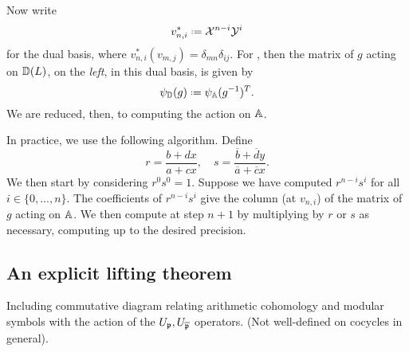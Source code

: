 \documentclass[a4paper,10pt]{article}
\numberwithin{equation}{section}
\begin{document}
Now write
\[
	v_{n,i}^* \defeq \mathcal{X}^{n-i}\mathcal{Y}^i
\]
for the dual basis, where $v_{n,i}^*(v_{m,j}) = \delta_{mn}\delta_{ij}.$ For , then the matrix of $g$ acting on $\mathbb{D}(L)$, on the \emph{left}, in this dual basis, is given by 
\[
	\psi_{\D}(g) \defeq \psi_{\A}(g^{-1})^T.
\]
We are reduced, then, to computing the action on $\mathbb{A}$.

In practice, we use the following algorithm. Define 
\[
	r = \frac{b+dx}{a+cx}, \hspace{12pt} s = \frac{\overline{b}+\overline{d}y}{\overline{a}+\overline{c}x}.
\]
We then start by considering $r^0s^0 = 1$. Suppose we have computed $r^{n-i}s^i$ for all $i \in \{0,...,n\}.$ The coefficients of $r^{n-i}s^i$ give the column (at $v_{n,i}$) of the matrix of $g$ acting on $\mathbb{A}$. We then compute at step $n+1$ by multiplying by $r$ or $s$ as necessary, computing up to the desired precision.


\subsection{An explicit lifting theorem}
Including commutative diagram relating arithmetic cohomology and modular symbols with the action of the $U_{\mathfrak{p}}, U_{\overline{\mathfrak{p}}}$ operators. (Not well-defined on cocycles in general).




\footnotesize
\renewcommand{\refname}{\normalsize References} 
{}


\Addresses
\end{document}
